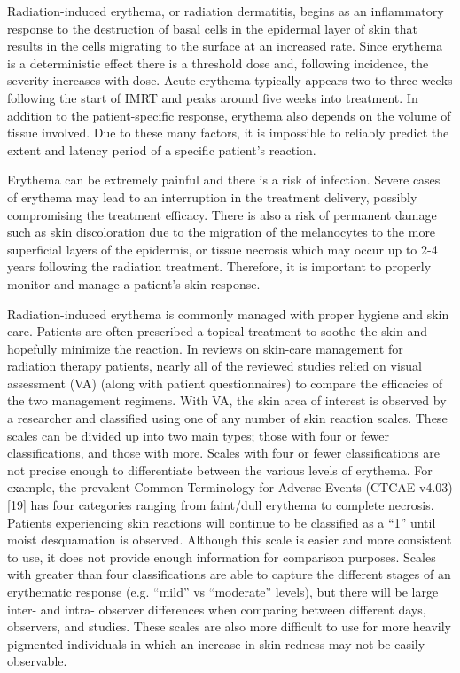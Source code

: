 Radiation-induced erythema, or radiation dermatitis, begins as an inflammatory response to the destruction of  basal cells in the epidermal layer of skin that results in the cells migrating to the surface at an increased rate.\cite{McQuestion2006} Since erythema is a deterministic effect there is a threshold dose and, following incidence, the severity increases with dose. Acute erythema typically appears two to three weeks following the start of IMRT and peaks around five weeks into treatment. In addition to the patient-specific response, erythema also depends on the volume of tissue involved. Due to these many factors, it is impossible to reliably predict the extent and latency period of a specific patient’s reaction.\cite{Porock2002}

Erythema can be extremely painful and there is a risk of infection. Severe cases of erythema may lead to an interruption in the treatment delivery, possibly compromising the treatment efficacy.\cite{Maciejewski1989} There is also a risk of permanent damage such as skin discoloration due to the migration of the melanocytes to the more superficial layers of the epidermis,\cite{McQuestion2006} or tissue necrosis which may occur up to 2-4 years following the radiation treatment.\cite{Lee2002} Therefore, it is important to properly monitor and manage a patient’s skin response.

Radiation-induced erythema is commonly managed with proper hygiene and skin care.\cite{McQuestion2006} Patients are often prescribed a topical treatment to soothe the skin and hopefully minimize the reaction. In reviews on skin-care management for radiation therapy patients, nearly all of the reviewed studies relied on visual assessment (VA) (along with patient questionnaires) to compare the efficacies of the two management regimens.\cite{McQuestion2006,Wong2013,Chan2014} With VA, the skin area of interest is observed by a researcher and classified using one of any number of skin reaction scales. These scales can be divided up into two main types; those with four or fewer classifications,\cite{Wan1983a,Cox1995,Lock-Andersen1998,Kirova2011} and those with more.\cite{Pearse1990,Wengstrom2004,Bodekaer2013} Scales with four or fewer classifications are not precise enough to differentiate between the various levels of erythema. For example, the prevalent Common Terminology for Adverse Events (CTCAE v4.03)[19] has four categories ranging from faint/dull erythema to complete necrosis. Patients experiencing skin reactions will continue to be classified as a “1” until moist desquamation is observed. Although this scale is easier and more consistent to use, it does not provide enough information for comparison purposes. Scales with greater than four classifications are able to capture the different stages of an erythematic response (e.g. “mild” vs “moderate” levels), but there will be large inter- and intra- observer differences when comparing between different days, observers, and studies. These scales are also more difficult to use for more heavily pigmented individuals in which an increase in skin redness may not be easily observable.

